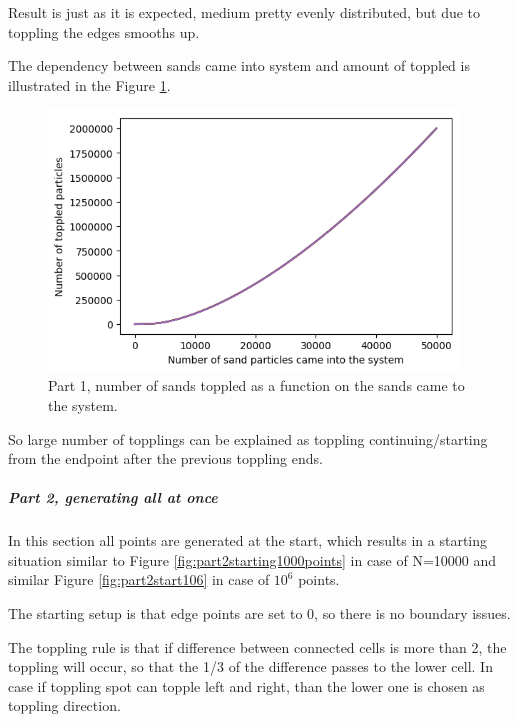 \documentclass{article}
\begin{document}
Result is just as it is expected, medium pretty evenly distributed,  but due to toppling the edges smooths up.

The dependency between sands came into system and amount of toppled is illustrated in the Figure \ref{fig:toppling}.

\begin{figure}[!hbt]
	\centering
	\includegraphics[width=4.3in]{toppling}
	\caption{Part 1, number of sands toppled as a function on the sands came to the system.}
	\label{fig:toppling}
\end{figure}

So large number of topplings can be explained as toppling continuing/starting from the endpoint after the previous toppling ends.


\clearpage
\subparagraph*{Part 2, generating all at once\\}

In this section all points are generated at the start, which results in a starting situation similar to Figure \ref{fig:part2starting1000points} in case of N=10000 and similar Figure \ref{fig:part2start106} in case of $10^6$ points.

The starting setup is that edge points are set to 0, so there is no boundary issues. 

The toppling rule is that if difference between connected cells is more than 2, the toppling will occur, so that the 1/3 of the difference passes to the lower cell. In case if toppling spot can topple left and right, than the lower one is chosen as toppling direction. 
\end{document}
